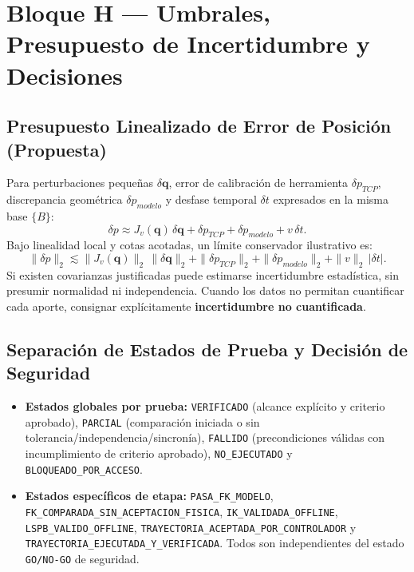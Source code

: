 \documentclass[10pt, a4paper]{article}
\begin{document}
\section{Bloque H — Umbrales, Presupuesto de Incertidumbre y Decisiones}

\subsection{Presupuesto Linealizado de Error de Posición (Propuesta)}
Para perturbaciones pequeñas $\delta \mathbf{q}$, error de calibración de herramienta $\delta p_{TCP}$, discrepancia geométrica $\delta p_{modelo}$ y desfase temporal $\delta t$ expresados en la misma base $\{B\}$:
\begin{equation}
    \delta p \approx J_v(\mathbf{q})\,\delta\mathbf{q} + \delta p_{TCP} + \delta p_{modelo} + v\,\delta t.
    \label{eq:budget_vec}
\end{equation}
Bajo linealidad local y cotas acotadas, un límite conservador ilustrativo es:
\begin{equation}
    \boxed{ \|\delta p\|_2 \lesssim \|J_v(\mathbf{q})\|_2\,\|\delta\mathbf{q}\|_2 + \|\delta p_{TCP}\|_2 + \|\delta p_{modelo}\|_2 + \|v\|_2\,|\delta t| }.
    \label{eq:budget_norm}
\end{equation}
Si existen covarianzas justificadas puede estimarse incertidumbre estadística, sin presumir normalidad ni independencia. Cuando los datos no permitan cuantificar cada aporte, consignar explícitamente \textbf{incertidumbre no cuantificada}.

\subsection{Separación de Estados de Prueba y Decisión de Seguridad}
\begin{itemize}[leftmargin=*, itemsep=2pt]
    \item \textbf{Estados globales por prueba:} \texttt{VERIFICADO} (alcance explícito y criterio aprobado), \texttt{PARCIAL} (comparación iniciada o sin tolerancia/independencia/sincronía), \texttt{FALLIDO} (precondiciones válidas con incumplimiento de criterio aprobado), \texttt{NO\_EJECUTADO} y \texttt{BLOQUEADO\_POR\_ACCESO}.
    \item \textbf{Estados específicos de etapa:} \texttt{PASA\_FK\_MODELO}, \texttt{FK\_COMPARADA\_SIN\_ACEPTACION\_FISICA}, \texttt{IK\_VALIDADA\_OFFLINE}, \texttt{LSPB\_VALIDO\_OFFLINE}, \texttt{TRAYECTORIA\_ACEPTADA\_POR\_CONTROLADOR} y \texttt{TRAYECTORIA\_EJECUTADA\_Y\_VERIFICADA}. Todos son independientes del estado \texttt{GO/NO-GO} de seguridad.
\end{itemize}
\end{document}
